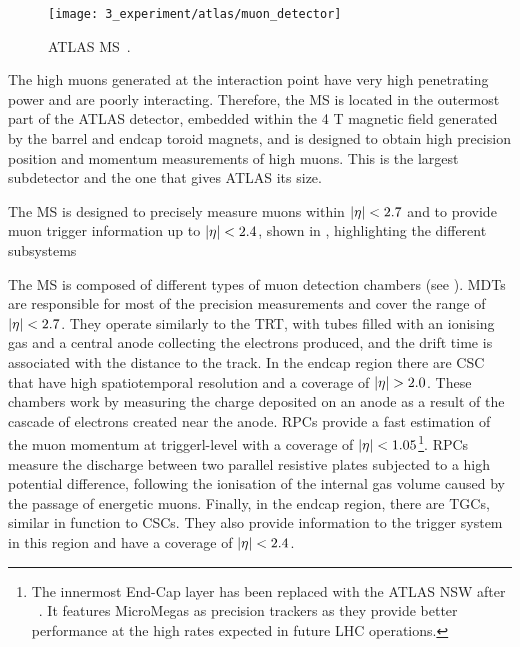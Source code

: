 \begin{figure}[ht!]
    \centering
    \texttt{[image: 3\_experiment/atlas/muon\_detector]}
    \caption{\ac{ATLAS} \acf{MS}~\cite{ATLAS}.}
    \label{fig:atlas:atlas:muon_spectrometer:muon_spectrometer}
\end{figure}

The high \pt muons generated at the interaction point have very high penetrating power and are poorly interacting. Therefore, the \ac{MS} \cite{ATLAS-Muon-TDR} is located in the outermost part of the \ac{ATLAS} detector, embedded within the 4 T magnetic field generated by the barrel and endcap toroid magnets, and is designed to obtain high precision position and momentum measurements of high \pt muons. This is the largest subdetector and the one that gives \ac{ATLAS} its size.

The \ac{MS} is designed to precisely measure muons within \(|\eta|<2.7\) and to provide muon trigger information up to \(|\eta|<2.4\), shown in \Fig{\ref{fig:atlas:atlas:muon_spectrometer:muon_spectrometer}}, highlighting the different subsystems

The \ac{MS} is composed of different types of muon detection chambers (see \Fig{\ref{fig:atlas:atlas:muon_spectrometer:muon_spectrometer}}). \acp{MDT} are responsible for most of the precision measurements and cover the range of \(|\eta|<2.7\). They operate similarly to the \ac{TRT}, with tubes filled with an ionising gas and a central anode collecting the electrons produced, and the drift time is associated with the distance to the track. In the endcap region there are \ac{CSC} that have high spatiotemporal resolution and a coverage of \(\abseta>2.0\). These chambers work by measuring the charge deposited on an anode as a result of the cascade of electrons created near the anode. \acp{RPC} provide a fast estimation of the muon momentum at triggerl-level with a coverage of \(|\eta|<1.05\)\footnote{The innermost End-Cap layer has been replaced with the \ac{ATLAS} \ac{NSW} after \RunTwo~\cite{ATLAS-NSW}. It features MicroMegas as precision trackers as they provide better performance at the high rates expected in future LHC operations.}. \acp{RPC} measure the discharge between two parallel resistive plates subjected to a high potential difference, following the ionisation of the internal gas volume caused by the passage of energetic muons. Finally, in the endcap region, there are \acp{TGC}, similar in function to \acp{CSC}. They also provide information to the trigger system in this region and have a coverage of \(|\eta|<2.4\).

